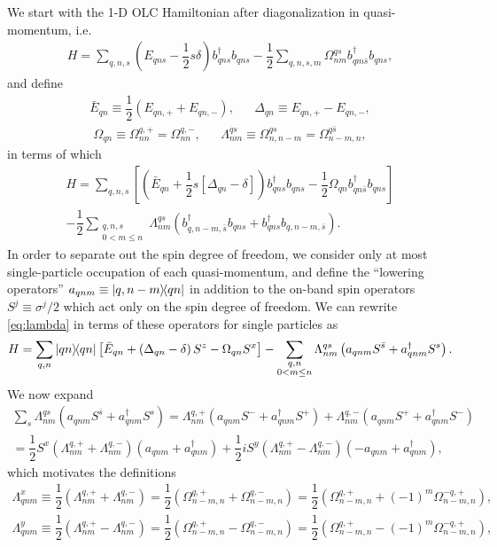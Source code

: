 \documentclass[aps,notitlepage,nofootinbib,11pt]{revtex4-1}
\newcommand{\f}[2]{\dfrac{#1}{#2}} %
\newcommand{\p}[1]{\left(#1\right)} %
\renewcommand{\sp}[1]{\left[#1\right]} %
\newcommand{\1}{\mathds{1}}
\begin{document}
We start with the 1-D OLC Hamiltonian after diagonalization in
quasi-momentum, i.e.
\begin{align}
  H
  = \sum_{q,n,s}\p{E_{qns}-\f12s\delta} b_{qns}^\dag b_{qns}
  - \f12\sum_{q,n,s,m} \Omega^{qs}_{nm} b_{qm\bar s}^\dag b_{qns},
\end{align}
and define
\begin{align}
  \bar E_{qn} \equiv \f12\p{E_{qn,+} + E_{qn,-}},
  &&
  \Delta_{qn} \equiv E_{qn,+} - E_{qn,-},
\end{align}
\begin{align}
  \Omega_{qn} \equiv \Omega^{q,+}_{nn} = \Omega^{q,-}_{nn},
  &&
  \Lambda^{qs}_{nm}
  \equiv \Omega^{qs}_{n,n-m} = \Omega^{q\bar s}_{n-m,n},
\end{align}
in terms of which
\begin{multline}
  H = \sum_{q,n,s}\sp{\p{\bar E_{qn} + \f12 s \sp{\Delta_{qn}-\delta}}
    b_{qns}^\dag b_{qns}
    - \f12\Omega_{qn} b_{qn\bar s}^\dag b_{qns}} \\
  - \f12\sum_{\substack{q,n,s\\0<m\le n}}\Lambda^{qs}_{nm}
  \p{b_{q,n-m,\bar s}^\dag b_{qns} + b_{qns}^\dag b_{q,n-m,\bar s}}.
  \label{eq:lambda}
\end{multline}
In order to separate out the spin degree of freedom, we consider only
at most single-particle occupation of each quasi-momentum, and define
the ``lowering operators'' $a_{qnm}\equiv\op{q,n-m}{qn}$ in addition
to the on-band spin operators $S^j\equiv\sigma^j/2$ which act only on
the spin degree of freedom.  We can rewrite \eqref{eq:lambda} in terms
of these operators for single particles as
\begin{align}
  H
  = \sum_{q,n} \op{qn}\sp{\bar E_{qn}
    + \p{\Delta_{qn}-\delta} S^z - \Omega_{qn} S^x}
  - \sum_{\substack{q,n\\0<m\le n}}\Lambda^{qs}_{nm}
  \p{a_{qnm} S^{\bar s} + a_{qnm}^\dag S^s}.
\end{align}
We now expand
\begin{multline}
  \sum_s\Lambda^{qs}_{nm}\p{a_{qnm} S^{\bar s} + a_{qnm}^\dag S^s} =
  \Lambda^{q,+}_{nm}\p{a_{qnm}S^- + a_{qnm}^\dag S^+}
  + \Lambda^{q,-}_{nm}\p{a_{qnm}S^+ + a_{qnm}^\dag S^-} \\
  = \f12S^x \p{\Lambda^{q,+}_{nm} + \Lambda^{q,-}_{nm}} \p{a_{qnm} +
    a_{qnm}^\dag} + \f12 iS^y \p{\Lambda^{q,+}_{nm} -
    \Lambda^{q,-}_{nm}} \p{-a_{qnm} + a_{qnm}^\dag},
\end{multline}
which motivates the definitions
\begin{align}
  \Lambda_{qnm}^x
  \equiv \f12\p{\Lambda^{q,+}_{nm} + \Lambda^{q,-}_{nm}}
  = \f12\p{\Omega^{q,+}_{n-m,n} + \Omega^{q,-}_{n-m,n}}
  = \f12\p{\Omega^{q,+}_{n-m,n} + \p{-1}^m\Omega^{-q,+}_{n-m,n}}, \\
  \Lambda_{qnm}^y
  \equiv \f12\p{\Lambda^{q,+}_{nm} - \Lambda^{q,-}_{nm}}
  = \f12\p{\Omega^{q,+}_{n-m,n} - \Omega^{q,-}_{n-m,n}}
  = \f12\p{\Omega^{q,+}_{n-m,n} - \p{-1}^m\Omega^{-q,+}_{n-m,n}},
\end{align}
\end{document}
